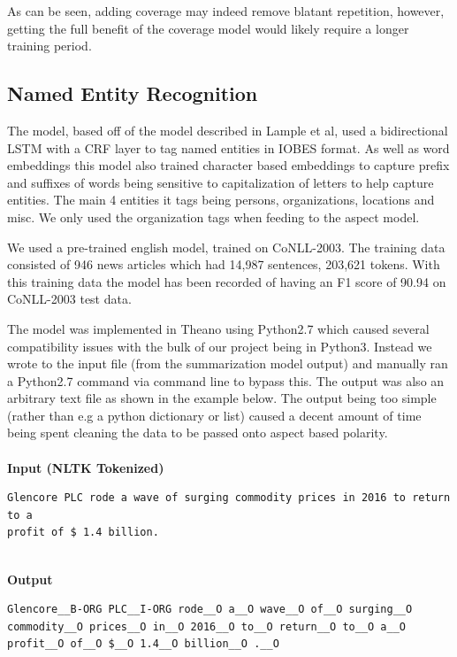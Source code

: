\documentclass[12pt,a4paper]{article}
\begin{document}
As can be seen, adding coverage may indeed remove blatant repetition, however, getting the full benefit of the coverage model would likely require a longer training period.

\subsection{Named Entity Recognition}
The model, based off of the model described in Lample et al\cite{Lample2016}, used a bidirectional LSTM with a CRF layer to tag named entities in IOBES format. As well as word embeddings this model also trained character based embeddings to capture prefix and suffixes of words being sensitive to capitalization of letters to help capture entities. The main 4 entities it tags being persons, organizations, locations and misc. We only used the organization tags when feeding to the aspect model.

We used a pre-trained english model, trained on CoNLL-2003. The training data consisted of 946 news articles which had 14,987 sentences, 203,621 tokens. With this training data the model has been recorded of having an F1 score of 90.94 on CoNLL-2003 test data.

The model was implemented in Theano using Python2.7 which caused several compatibility issues with the bulk of our project being in Python3. Instead we wrote to the input file (from the summarization model output) and manually ran a Python2.7 command via command line to bypass this. The output was also an arbitrary text file as shown in the example below. The output being too simple (rather than e.g a python dictionary or list) caused a decent amount of time being spent cleaning the data to be passed onto aspect based polarity.
\\ \\
\textbf{Input (NLTK Tokenized)}
\begin{verbatim}
Glencore PLC rode a wave of surging commodity prices in 2016 to return to a 
profit of $ 1.4 billion.
\end{verbatim}  \hspace{1cm} \\
\textbf{Output}

\begin{verbatim}
Glencore__B-ORG PLC__I-ORG rode__O a__O wave__O of__O surging__O 
commodity__O prices__O in__O 2016__O to__O return__O to__O a__O 
profit__O of__O $__O 1.4__O billion__O .__O
\end{verbatim}

\break
\end{document}
